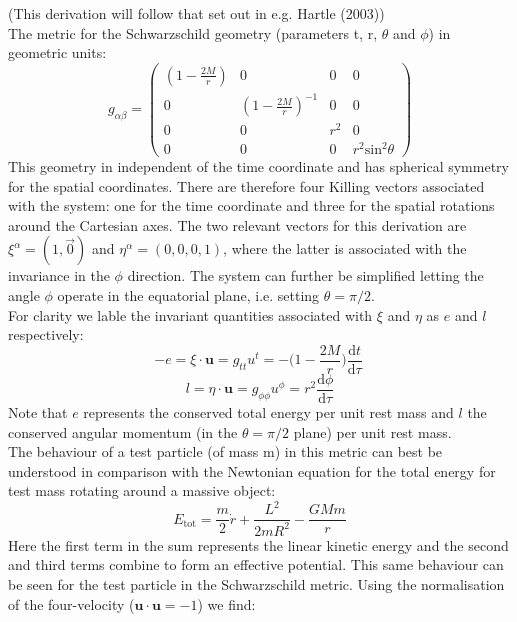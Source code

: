 \documentclass[11pt]{article}
\begin{document}
\begin{framed}
\noindent
(This derivation will follow that set out in e.g. Hartle (2003))\\
\noindent
The metric for the Schwarzschild geometry (parameters t, r, $\theta$ and $\phi$) in geometric units:
\begin{equation}
	g_{\alpha\beta} = 
		\begin{pmatrix}
			(1-\frac{2M}{r}) & 0 & 0 & 0 \\
			0 & (1-\frac{2M}{r})^{-1} & 0 & 0 \\
			0 & 0 & r^2 & 0 \\
			0 & 0 & 0 & r^2\mathrm{sin}^2\theta 
		\end{pmatrix}
\end{equation}
\noindent
This geometry in independent of the time coordinate and has spherical symmetry for the spatial coordinates. There are therefore four Killing vectors associated with the system: one for the time coordinate and three for the spatial rotations around the Cartesian axes. The two relevant vectors for this derivation are $\xi^{\alpha} = (1,\vec{0})$ and $\eta^{\alpha} = (0,0,0,1)$, where the latter is associated with the invariance in the $\phi$ direction. The system can further be simplified letting the angle $\phi$ operate in the equatorial plane, i.e. setting $\theta = \pi/2$.\\
For clarity we lable the invariant quantities associated with $\xi$ and $\eta$ as $e$ and $l$ respectively:
\begin{equation}
	-e = \xi \cdot \mathbf{u} = g_{tt}u^t = -\Big(1-\frac{2M}{r}\Big)\frac{\mathrm{d}t}{\mathrm{d}\tau}\
	\label{eq:Econs}
\end{equation}
\begin{equation}
	l = \eta \cdot \mathbf{u} = g_{\phi\phi}u^{\phi} = r^2\frac{\mathrm{d}\phi}{\mathrm{d}\tau}
	\label{eq:Lcons}
\end{equation}
Note that $e$ represents the conserved total energy per unit rest mass and $l$ the conserved angular momentum (in the $\theta = \pi/2$ plane) per unit rest mass.\\
\indent The behaviour of a test particle (of mass m) in this metric can best be understood in comparison with the Newtonian equation for the total energy for test mass rotating around a massive object:
$$
E_{\mathrm{tot}} = \frac{m}{2}\dot{r} + \frac{L^2}{2mR^2} - \frac{GMm}{r}
$$
Here the first term in the sum represents the linear kinetic energy and the second and third terms combine to form an effective potential. This same behaviour can be seen for the test particle in the Schwarzschild metric. Using the normalisation of the four-velocity ($\mathbf{u}\cdot\mathbf{u} = -1$) we find:

\end{framed}
\end{document}
